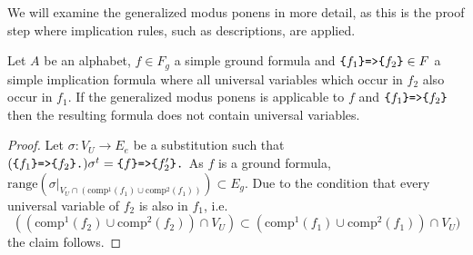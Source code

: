 %  
 


We will examine the generalized modus ponens in more detail,
as this is the proof step where implication rules, 
such as \restdesc descriptions, are applied.

\label{sec:Reasoning}
\begin{lemma}\label{lemma:Reasoning}
Let $A$ be an \nthree alphabet, %
$f\in F_g$ a simple ground formula and $\verb!{!f_1\verb!}=>{!f_2\verb!}!\in F$ a simple implication formula %
where all 
universal variables which occur in $f_2$ %
also occur in $f_1$. If the generalized modus ponens is applicable to $f$ and $\verb!{!f_1\verb!}=>{!f_2\verb!}!$ then
the resulting formula does not contain universal variables.
\end{lemma}

\begin{proof}
 Let $\sigma:V_U\rightarrow E_e$ be a substitution %
 such that  $(\verb!{!f_1\verb!}=>{!f_2\verb!}.!)\sigma^t= \verb!{!f\verb!}=>{!f_2'\verb!}.!$ 
As $f$ is a ground formula, $\text{range}(\sigma|_{V_U\cap(\text{comp}^1(f_1)\cup \text{comp}^2(f_1))}) \subset E_g$. 
Due to the condition that every universal variable of $f_2$ 
is also in $f_1$, i.e. 
\[((\text{comp}^1(f_2)\cup \text{comp}^2(f_2))\cap V_U )\subset (\text{comp}^1(f_1)\cup \text{comp}^2(f_1))\cap V_U)\]
the claim follows. 
%
\end{proof}


